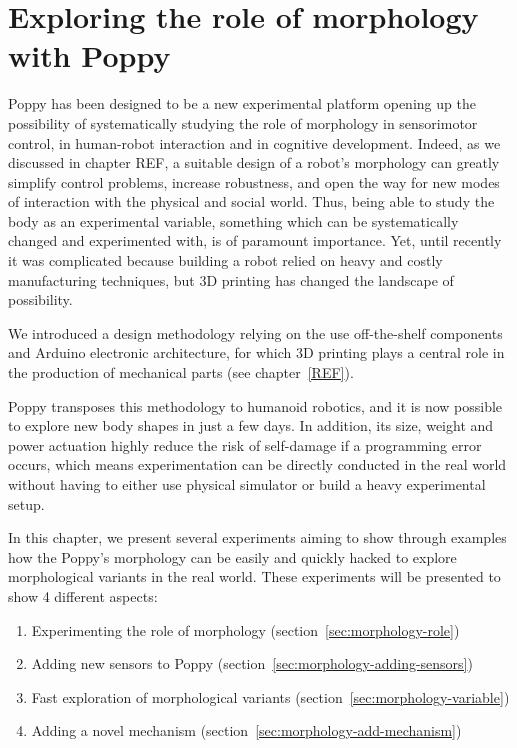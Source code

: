 
% 


\chapter{Exploring the role of morphology with Poppy} %
\label{cha:exploring_the_role_of_morphology}


Poppy has been designed to be a new experimental platform opening up the possibility of systematically studying the role of morphology in sensorimotor control, in human-robot interaction and in cognitive development. Indeed, as we discussed in chapter REF, a suitable design of a robot’s morphology can greatly simplify control problems, increase robustness, and open the way for new modes of interaction with the physical and social world. Thus, being able to study the body as an experimental variable, something which can be systematically changed and experimented with, is of paramount importance. Yet, until recently it was complicated because building a robot relied on heavy and costly manufacturing techniques, but 3D printing has changed the landscape of possibility.

We introduced a design methodology relying on the use off-the-shelf components and Arduino electronic architecture, for which 3D printing plays a central role in the production of mechanical parts (see chapter~\ref{REF}).

Poppy transposes this methodology to humanoid robotics, and it is now possible to explore new body shapes in just a few days. In addition, its size, weight and power actuation highly reduce the risk of self-damage if a programming error occurs, which means experimentation can be directly conducted in the real world without having to either use physical simulator or build a heavy experimental setup.

In this chapter, we present several experiments aiming to show through examples how the Poppy's morphology can be easily and quickly hacked  to explore morphological variants in the real world.
These experiments will be presented to show 4 different aspects:

\begin{enumerate}
    \item Experimenting the role of morphology (section~\ref{sec:morphology-role})
    \item Adding new sensors to Poppy (section~\ref{sec:morphology-adding-sensors})
    \item Fast exploration of morphological variants (section~\ref{sec:morphology-variable})
    \item Adding a novel mechanism (section~\ref{sec:morphology-add-mechanism})
\end{enumerate}



